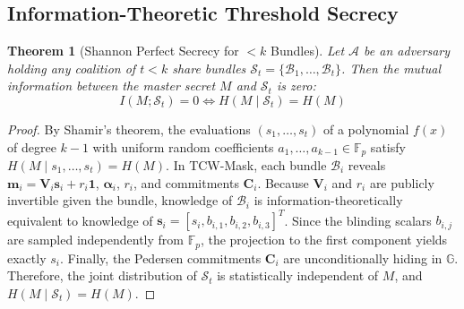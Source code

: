 \documentclass[10pt,journal,compsoc]{IEEEtran}
\newtheorem{theorem}{Theorem}
\begin{document}
\subsection{Information-Theoretic Threshold Secrecy}
\begin{theorem}[Shannon Perfect Secrecy for $< k$ Bundles]
Let $\mathcal{A}$ be an adversary holding any coalition of $t < k$ share bundles $\mathcal{S}_t = \{\mathcal{B}_1, \dots, \mathcal{B}_t\}$. Then the mutual information between the master secret $M$ and $\mathcal{S}_t$ is zero:
\begin{equation}
I(M; \mathcal{S}_t) = 0 \iff H(M \mid \mathcal{S}_t) = H(M)
\end{equation}
\end{theorem}
\begin{proof}
By Shamir's theorem, the evaluations $(s_1, \dots, s_t)$ of a polynomial $f(x)$ of degree $k-1$ with uniform random coefficients $a_1, \dots, a_{k-1} \in \mathbb{F}_p$ satisfy $H(M \mid s_1, \dots, s_t) = H(M)$. In TCW-Mask, each bundle $\mathcal{B}_i$ reveals $\mathbf{m}_i = \mathbf{V}_i \mathbf{s}_i + r_i \mathbf{1}$, $\boldsymbol{\alpha}_i$, $r_i$, and commitments $\mathbf{C}_i$. Because $\mathbf{V}_i$ and $r_i$ are publicly invertible given the bundle, knowledge of $\mathcal{B}_i$ is information-theoretically equivalent to knowledge of $\mathbf{s}_i = [s_i, b_{i,1}, b_{i,2}, b_{i,3}]^T$. Since the blinding scalars $b_{i, j}$ are sampled independently from $\mathbb{F}_p$, the projection to the first component yields exactly $s_i$. Finally, the Pedersen commitments $\mathbf{C}_i$ are unconditionally hiding in $\mathbb{G}$. Therefore, the joint distribution of $\mathcal{S}_t$ is statistically independent of $M$, and $H(M \mid \mathcal{S}_t) = H(M)$.
\end{proof}
\end{document}
